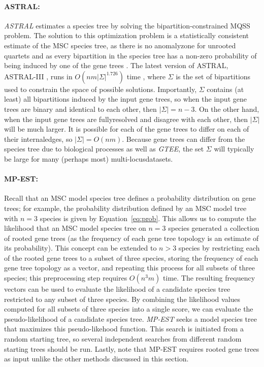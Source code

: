 \paragraph{ASTRAL:}
\textit{\gls{ASTRAL}} \cite{mirarab2014astral} estimates a species tree by solving the \gls{bipartition-constrained} \gls{MQSS} problem.
The solution to this optimization problem is a statistically consistent estimate of the MSC species tree, as there is no \gls{anomalyzone} for unrooted quartets and as every bipartition in the species tree has a non-zero probability of being induced by one of the gene trees \cite{mirarab2014astral}.
The latest version of ASTRAL, ASTRAL-III \cite{zhang2018astral3}, runs in $O( n m | \Sigma |^{1.726})$ time \cite{kanetao2017bound, zhang2018astral3}, where $\Sigma$ is the set of \glspl{bipartition} used to constrain the space of possible solutions.
Importantly, $\Sigma$ contains (at least) all bipartitions induced by the input gene trees, so when the input gene trees are binary and identical to each other, then $| \Sigma | = n - 3$.
On the other hand, when the input gene trees are \gls{fullyresolved} and \gls{disagree} with each other, then $| \Sigma |$ will be much larger. 
It is possible for each of the gene trees to differ on each of their \glspl{internaledge}, so $| \Sigma | = O(nm)$.
Because gene trees can differ from the species tree due to biological processes as well as \textit{\gls{GTEE}}, the set $\Sigma$ will typically be large for many (perhaps most) \glspl{multi-locusdataset}.
 
\paragraph{MP-EST:}
Recall that an MSC model species tree defines a probability distribution on gene trees; for example, the probability distribution defined by an MSC model tree with $n=3$ species is given by Equation~\ref{eq:prob}.
This allows us to compute the likelihood that an MSC model species tree on $n=3$ species generated a collection of \gls{rooted} gene trees (as the frequency of each gene tree topology is an estimate of its probability).
This concept can be extended to $n>3$ species by restricting each of the rooted gene trees to a subset of three species, storing the frequency of each gene tree topology as a vector, and repeating this process for all subsets of three species; this preprocessing step requires $O(n^3m)$ time.
The resulting frequency vectors can be used to evaluate the likelihood of a candidate species tree restricted to any subset of three species.
By combining the likelihood values computed for all subsets of three species into a single score, we can evaluate the pseudo-likelihood of a candidate species tree.
\textit{\gls{MP-EST}} \cite{liu2010maximum-mpest} seeks a model species tree that maximizes this pseudo-likehood function.
This search is initiated from a random starting tree, so several independent searches from different random starting trees should be run.
Lastly, note that MP-EST requires rooted gene trees as input unlike the other methods discussed in this section.

